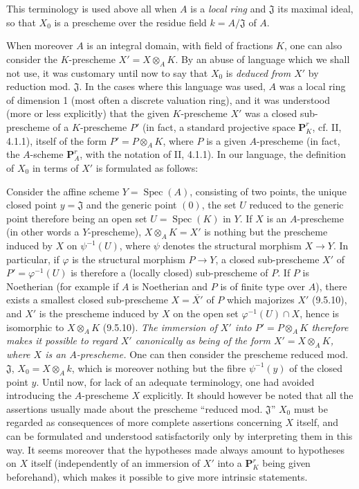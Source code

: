 \begin{env}[3.7.2]
\label{I.3.7.2}
This terminology is used above all when $A$ is a \emph{local
ring} and $\mathfrak{J}$ its maximal ideal, so that $X_0$ is a
prescheme over the residue field $k=A/\mathfrak{J}$ of $A$.

When moreover $A$ is an integral domain, with field of fractions $K$, one can
also consider the $K$-prescheme $X'=X\otimes_A K$. By an abuse of language which
we shall not use, it was customary until now to say that $X_0$ is
\emph{deduced from $X'$} by reduction mod. $\mathfrak{J}$. In the cases where
this language was used, $A$ was a local ring of dimension 1 (most
often a discrete valuation ring), and it was understood (more or less
explicitly) that the given $K$-prescheme $X'$ was a
closed sub-prescheme of a $K$-prescheme $P'$ (in fact, a standard projective
space $\mathbf{P}_K^r$, cf. II, 4.1.1), itself of the form
$P'=P\otimes_A K$, where $P$ is a given $A$-prescheme (in fact, the $A$-scheme
$\mathbf{P}_A^r$, with the notation of II, 4.1.1). In our language, the
definition of $X_0$ in terms of $X'$ is formulated as follows:

Consider the affine scheme $Y=\operatorname{Spec}(A)$, consisting of two
points, the unique
closed point $y=\mathfrak{J}$ and the generic point $(0)$, the set $U$ reduced
to the generic point therefore being an open set $U=\operatorname{Spec}(K)$ in
$Y$. If $X$ is an $A$-prescheme (in other words a $Y$-prescheme),
$X\otimes_A K=X'$ is nothing but the prescheme induced by $X$ on
$\psi^{-1}(U)$, where $\psi$ denotes the structural morphism $X\to Y$. In
particular, if $\varphi$ is the structural morphism $P\to Y$, a
closed sub-prescheme $X'$ of $P'=\varphi^{-1}(U)$ is therefore a (locally
closed) sub-prescheme of $P$. If $P$ is Noetherian (for example if $A$ is
Noetherian and $P$ is of finite type over $A$), there exists a smallest
closed sub-prescheme $X=\overline{X'}$ of $P$ which majorizes $X'$ (9.5.10),
and $X'$ is the prescheme induced by $X$ on the open set
$\varphi^{-1}(U)\cap X$, hence is isomorphic to $X\otimes_A K$ (9.5.10).
\emph{The immersion of $X'$ into $P'=P\otimes_A K$ therefore makes it possible
to regard $X'$ canonically as being of the form $X'=X\otimes_A K$, where
$X$ is an $A$-prescheme.} One can then consider the prescheme reduced mod.
$\mathfrak{J}$, $X_0=X\otimes_A k$, which is moreover nothing but the fibre
$\psi^{-1}(y)$ of the closed point $y$. Until now, for lack of an adequate
terminology, one had avoided introducing the $A$-prescheme $X$ explicitly. It
should however be noted that all the assertions usually made
about the prescheme ``reduced mod. $\mathfrak{J}$'' $X_0$ must be regarded
as consequences of more complete assertions concerning $X$ itself, and
can be formulated and understood satisfactorily only by
interpreting them in this way. It seems moreover that the hypotheses made always
amount to hypotheses on $X$ itself (independently of an immersion of $X'$ into
a $\mathbf{P}_K^r$ being given beforehand), which makes it possible to
give more intrinsic statements.
\end{env}

